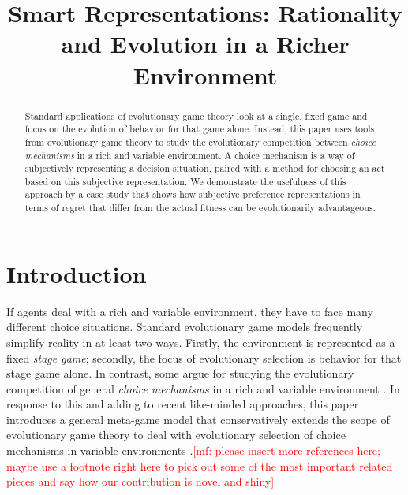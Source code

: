 \documentclass[fleqn,reqno,12pt]{article}
\title{Smart Representations: {R}ationality and Evolution in a Richer  Environment}
\date{}
\theoremstyle{Satz}
\theoremstyle{Bsp}
\newcommand{\mf}[1]{\textcolor{Red}{[mf: #1]}}
\begin{document}
\maketitle

\begin{abstract}
  \normalsize Standard applications of evolutionary game theory look at a single, fixed game
  and focus on the evolution of behavior for that game alone. Instead, this paper uses tools
  from evolutionary game theory to study the evolutionary competition between \emph{choice
    mechanisms} in a rich and variable environment. A choice mechanism is a way of subjectively
  representing a decision situation, paired with a method for choosing an act based on this
  subjective representation. We demonstrate the usefulness of this approach by a case study
  that shows how subjective preference representations in terms of regret that differ from the
  actual fitness can be evolutionarily advantageous.
\end{abstract}

\newpage

\section{Introduction}
\label{sec:intr--motiv}



If agents deal with a rich and variable environment, they have to face many different choice
situations.  Standard evolutionary game models frequently simplify reality in at least two
ways. Firstly, the environment is represented as a fixed \emph{stage game}; secondly, the focus
of evolutionary selection is behavior for that stage game alone. In contrast, some argue for
studying the evolutionary competition of general \emph{choice mechanisms} in a rich and
variable environment
\citep[e.g.,][]{FawcettHamblin2013:Exposing-the-be,McNamara2013:Towards-a-Riche,HammStev12}. In
response to this and adding to recent like-minded approaches, this paper introduces a general
meta-game model that conservatively extends the scope of evolutionary game theory to deal with
evolutionary selection of choice mechanisms in variable environments \citep[see, inter alia,
related work
by][]{Harley1981:Learning-the-Ev,ZollmanSmead2010:Plasticity-and-,SmeadZollman2013:The-Stability-o,OConnor2016:Evolving-to-Gen}.\mf{please
insert more references here; maybe use a footnote right here to pick out some of the most
important related pieces and say how our contribution is novel and shiny}
\end{document}
